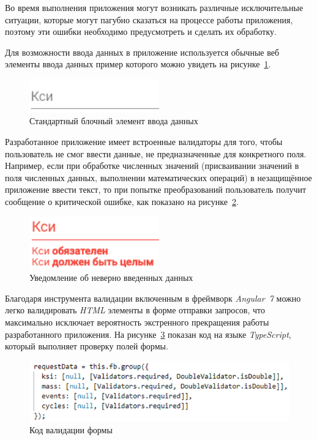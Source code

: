 Во время выполнения приложения могут возникать различные исключительные ситуации, которые могут пагубно сказаться на процессе работы приложения, поэтому эти ошибки необходимо предусмотреть и сделать их обработку.

Для возможности ввода данных в приложение используется обычные веб элементы ввода данных пример которого можно увидеть на рисунке~\ref{fig:input-empty}.

\begin{figure}[!h]
	\centering
	\includegraphics[width=0.5\textwidth]{figures/input-empty.png}
	\caption{Стандартный блочный элемент ввода данных}
	\label{fig:input-empty}
\end{figure}

Разработанное приложение имеет встроенные валидаторы для того, чтобы пользователь не смог ввести данные, не предназначенные для конкретного поля. Например, если при обработке численных значений (присваивании значений в поля численных данных, выполнении математических операций) в незащищённое приложение ввести текст, то при попытке преобразований пользователь получит сообщение о критической ошибке, как показано на рисунке~\ref{fig:input-invalid}.

\begin{figure}[!h]
	\centering
	\includegraphics[width=0.5\textwidth]{figures/input-invalid.png}
	\caption{Уведомление об неверно введенных данных}
	\label{fig:input-invalid}
\end{figure}

Благодаря инструмента валидации включенным в фреймворк \textit{Angular~7} можно легко валидировать \textit{HTML} элементы в форме отправки запросов, что максимально исключает вероятность экстренного прекращения работы разработанного приложения. На рисунке~\ref{fig:validation-code} показан код на языке \textit{TypeScript}, который выполняет проверку полей формы.

\begin{figure}[!h]
	\centering
	\includegraphics[width=\textwidth]{figures/validation-code.png}
	\caption{Код валидации формы}
	\label{fig:validation-code}
\end{figure}

